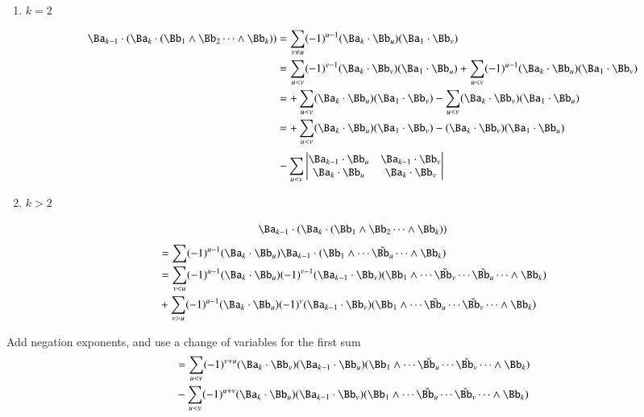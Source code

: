 \begin{enumerate}
\item $k=2$

\begin{align*}
\Ba_{k-1} \cdot (\Ba_k \cdot (\Bb_1 \wedge \Bb_2 \cdots \wedge \Bb_k))
&= \sum_{v \ne u} (-1)^{u-1} (\Ba_k \cdot \Bb_u) (\Ba_1 \cdot \Bb_v) \\
&= 
 \sum_{u < v} (-1)^{v-1} (\Ba_k \cdot \Bb_v) (\Ba_1 \cdot \Bb_u) 
+\sum_{u < v} (-1)^{u-1} (\Ba_k \cdot \Bb_u) (\Ba_1 \cdot \Bb_v) \\
&= 
+\sum_{u < v} (\Ba_k \cdot \Bb_u) (\Ba_1 \cdot \Bb_v) 
-\sum_{u < v} (\Ba_k \cdot \Bb_v) (\Ba_1 \cdot \Bb_u) \\
&= 
+\sum_{u< v} (\Ba_k \cdot \Bb_u) (\Ba_1 \cdot \Bb_v) 
- (\Ba_k \cdot \Bb_v) (\Ba_1 \cdot \Bb_u) \\
\end{align*}
\begin{equation}\label{eqn:bladegradereduction:k2dot}
-\sum_{u< v}
\begin{vmatrix}
\Ba_{k-1} \cdot \Bb_u & \Ba_{k-1} \cdot \Bb_v \\
\Ba_k \cdot \Bb_u & \Ba_k \cdot \Bb_v \\
\end{vmatrix}
\end{equation}

\item $k>2$
\end{enumerate}

\[
\Ba_{k-1} \cdot (\Ba_k \cdot (\Bb_1 \wedge \Bb_2 \cdots \wedge \Bb_k))
\]
\begin{align*}
&= \sum (-1)^{u-1} (\Ba_k \cdot \Bb_u) \Ba_{k-1} \cdot (\Bb_1 \wedge \cdots \check{\Bb_u} \cdots \wedge \Bb_k) \\
&= \sum_{v<u} (-1)^{u-1} (\Ba_k \cdot \Bb_u) (-1)^{v-1} (\Ba_{k-1} \cdot \Bb_v) (\Bb_1 \wedge \cdots \check{\Bb_v} \cdots \check{\Bb_u} \cdots \wedge \Bb_k) \\
&+ \sum_{v>u} (-1)^{u-1} (\Ba_k \cdot \Bb_u) (-1)^{v} (\Ba_{k-1} \cdot \Bb_v) (\Bb_1 \wedge \cdots \check{\Bb_u} \cdots \check{\Bb_v} \cdots \wedge \Bb_k) \\
\end{align*}

Add negation exponents, and use a change of variables for the first sum
\begin{align*}
&= \sum_{u<v} (-1)^{v+u} (\Ba_k \cdot \Bb_v) (\Ba_{k-1} \cdot \Bb_u) (\Bb_1 \wedge \cdots \check{\Bb_u} \cdots \check{\Bb_v} \cdots \wedge \Bb_k) \\
&- \sum_{u<v} (-1)^{u+v} (\Ba_k \cdot \Bb_u) (\Ba_{k-1} \cdot \Bb_v) (\Bb_1 \wedge \cdots \check{\Bb_u} \cdots \check{\Bb_v} \cdots \wedge \Bb_k) \\
\end{align*}

